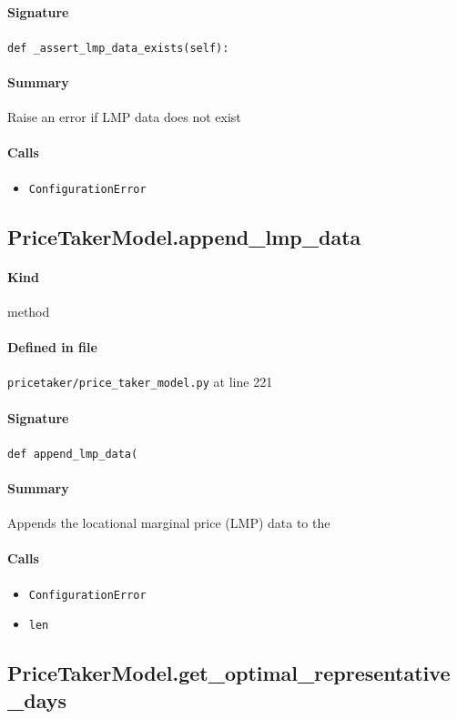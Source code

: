\documentclass[11pt]{report}
\begin{document}
\paragraph{Signature} \texttt{def \_assert\_lmp\_data\_exists(self):}
\paragraph{Summary} Raise an error if LMP data does not exist
\paragraph{Calls}
\begin{itemize}[leftmargin=*]
  \item \texttt{ConfigurationError}
\end{itemize}
\subsection{PriceTakerModel.append\_lmp\_data}
\label{def:pricetaker-price_taker_model.py:PriceTakerModel.append_lmp_data:L221}
\paragraph{Kind} method
\paragraph{Defined in file} \texttt{pricetaker/price\_taker\_model.py} at line 221
\paragraph{Signature} \texttt{def append\_lmp\_data(}
\paragraph{Summary} Appends the locational marginal price (LMP) data to the
\paragraph{Calls}
\begin{itemize}[leftmargin=*]
  \item \texttt{ConfigurationError}
  \item \texttt{len}
\end{itemize}
\subsection{PriceTakerModel.get\_optimal\_representative\_days}
\label{def:pricetaker-price_taker_model.py:PriceTakerModel.get_optimal_representative_days:L262}
\end{document}
